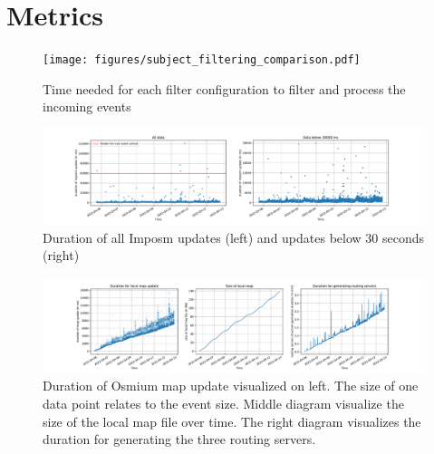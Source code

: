 \documentclass[conference]{IEEEtran}
\begin{document}
\printbibliography




\newpage\phantom{x}

 \appendices
 
   \section{Metrics}
  \label{appendix:graphics}
  
 \begin{figure}[!ht]
    \centering
    \texttt{[image: figures/subject\_filtering\_comparison.pdf]}
    \parbox{\textwidth}{\caption{Time needed for each filter configuration to filter and process the incoming events}}
    \label{fig:time_comparison_diagram}
\end{figure}
 
  \begin{figure}[!ht]
    \centering
    \includegraphics[width=\textwidth]{figures/renderer_statistic.pdf}
    \parbox{\textwidth}{\caption{Duration of all Imposm updates (left) and updates below 30 seconds (right)}}
    \label{fig:renderer_diagram}
\end{figure}

\begin{figure}[!ht]
    \centering
    \includegraphics[width=\textwidth]{figures/routing_statistic.pdf}
    \parbox{\textwidth}{\caption{Duration of Osmium map update visualized on left. The size of one data point relates to the event size. Middle diagram visualize the size of the local map file over time. The right diagram visualizes the duration for generating the three routing servers. }}
    \label{fig:routing_diagram}
\end{figure}
\end{document}
